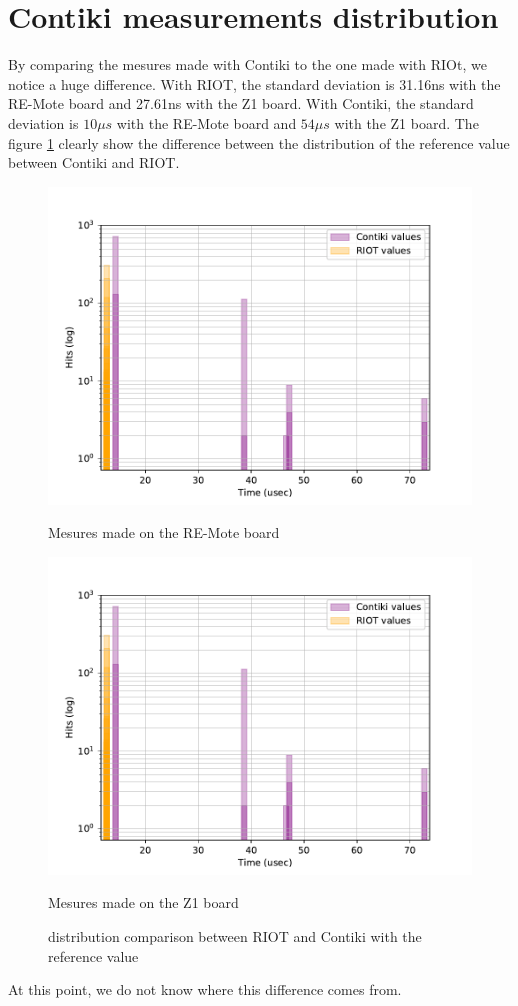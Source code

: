 \section{Contiki measurements distribution}

By comparing the mesures made with Contiki to the one made with RIOt, we notice a huge difference.
With RIOT, the standard deviation is 31.16ns with the RE-Mote board and 27.61ns with the Z1 board.
With Contiki, the standard deviation is $10\mu s$ with the RE-Mote board and $54\mu s$ with the Z1 board.
The figure \ref{fig:deviation-ref-value} clearly show the difference between the distribution of the reference value between Contiki and RIOT.

\begin{figure}[!ht]
  \centering
  \includegraphics[scale=.7]{assets/offset-remote.pdf}
  \caption*{Mesures made on the RE-Mote board}
  \includegraphics[scale=.7]{assets/offset-remote.pdf}
  \caption*{Mesures made on the Z1 board}
  \caption{distribution comparison between RIOT and Contiki with the reference value\label{fig:deviation-ref-value}}
\end{figure}

At this point, we do not know where this difference comes from.